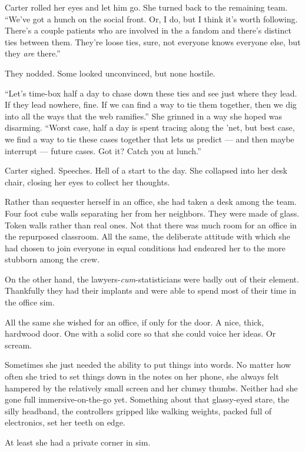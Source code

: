 Carter rolled her eyes and let him go. She turned back to the remaining team. ``We've got a hunch on the social front. Or, I do, but I think it's worth following. There's a couple patients who are involved in the a fandom and there's distinct ties between them. They're loose ties, sure, not everyone knows everyone else, but they \emph{are} there.''

They nodded. Some looked unconvinced, but none hostile.

``Let's time-box half a day to chase down these ties and see just where they lead. If they lead nowhere, fine. If we can find a way to tie them together, then we dig into all the ways that the web ramifies.'' She grinned in a way she hoped was disarming. ``Worst case, half a day is spent tracing along the 'net, but best case, we find a way to tie these cases together that lets us predict — and then maybe interrupt — future cases. Got it? Catch you at lunch.''

Carter sighed. Speeches. Hell of a start to the day. She collapsed into her desk chair, closing her eyes to collect her thoughts.

Rather than sequester herself in an office, she had taken a desk among the team. Four foot cube walls separating her from her neighbors. They were made of glass. Token walls rather than real ones. Not that there was much room for an office in the repurposed classroom. All the same, the deliberate attitude with which she had chosen to join everyone in equal conditions had endeared her to the more stubborn among the crew.

On the other hand, the lawyers-\emph{cum}-statisticians were badly out of their element. Thankfully they had their implants and were able to spend most of their time in the office sim.

All the same she wished for an office, if only for the door. A nice, thick, hardwood door. One with a solid core so that she could voice her ideas. Or scream.

Sometimes she just needed the ability to put things into words. No matter how often she tried to set things down in the notes on her phone, she always felt hampered by the relatively small screen and her clumsy thumbs. Neither had she gone full immersive-on-the-go yet. Something about that glassy-eyed stare, the silly headband, the controllers gripped like walking weights, packed full of electronics, set her teeth on edge.

At least she had a private corner in sim.

